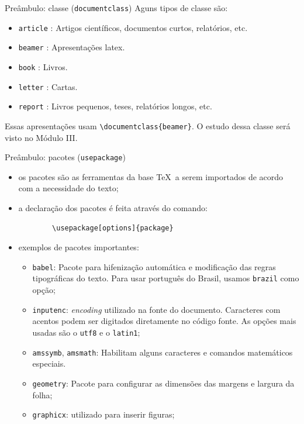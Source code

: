 \documentclass[c]{beamer}
\begin{document}
{\begin{frame}[fragile]{\sc Preâmbulo: classe (\texttt{documentclass})}
Aguns tipos de classe são:
	\begin{itemize}
	\setlength\itemsep{0.2cm}
	\item \verb|article| : Artigos científicos, documentos curtos, relatórios, etc.
	\item \verb|beamer| : Apresentações latex.
	\item \verb|book| : Livros.
	\item \verb|letter| : Cartas.
	\item \verb|report| : Livros pequenos, teses, relatórios longos, etc.
\end{itemize}
Essas apresentações usam \verb|\documentclass{beamer}|. O estudo dessa classe será visto no Módulo III.
\end{frame}


\begin{frame}[fragile]{\sc Preâmbulo: pacotes (\texttt{usepackage})}
	\begin{itemize}
		\setlength\itemsep{0.2cm}
		\item os {\color{blue} pacotes} são as ferramentas da base \TeX\ a serem {\color{blue} importados} de acordo com 
		a {\color{blue} necessidade} do texto;
		\item  a {\color{blue} declaração} dos pacotes é feita através do {\color{blue} comando}:
		\begin{verbatim}
		\usepackage[options]{package}
		\end{verbatim}
		\item {\color{blue} exemplos} de pacotes importantes:
    \begin{itemize}
    	\item \verb|babel|: Pacote para {\color{blue} hifenização} automática e modificação das {\color{blue} regras tipográficas} do texto. 
    	Para usar português do Brasil, usamos \texttt{brazil} como opção;
    	\item \verb|inputenc|: \emph{{\color{blue} encoding}} utilizado na fonte do documento. 
    	Caracteres com {\color{blue} acentos} podem ser digitados diretamente no código fonte. 
    	As opções mais usadas são o \verb|utf8| e o \verb|latin1|;
    	\item \verb|amssymb|, \verb|amsmath|: Habilitam alguns {\color{blue} caracteres} e {\color{blue} comandos matemáticos} especiais.
    	\item \verb|geometry|: Pacote para configurar as dimensões das {\color{blue} margens} e {\color{blue} largura}
    	da folha;
		\item \verb|graphicx|: utilizado para inserir {\color{blue} figuras};
		\end{itemize}
	\end{itemize}
\end{frame}


}
\end{document}
